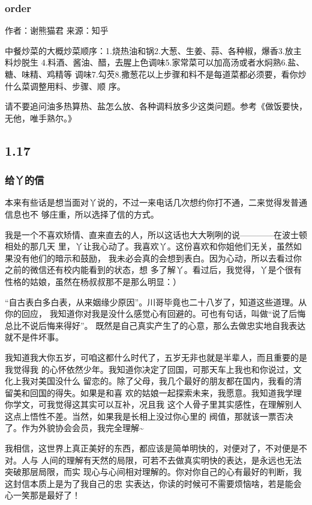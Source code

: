 \documentclass[11pt]{article}
\begin{document}
\subsubsection*{order}
\label{sec:orgheadline29}
作者：谢熊猫君
来源：知乎

中餐炒菜的大概炒菜顺序：1.烧热油和锅2.大葱、生姜、蒜、各种椒，爆香3.放主料炒脱生
4.料酒、酱油、醋，去腥上色调味5.家常菜可以加高汤或者水焖熟6.盐、糖、味精、鸡精等
调味7.勾芡8.撒葱花以上步骤和料不是每道菜都必须要，看你炒什么菜调整用料、步骤、顺
序。

请不要追问油多热算热、盐怎么放、各种调料放多少这类问题。参考《做饭要快，无他，唯手熟尔。》
\subsection*{1.17}
\label{sec:orgheadline32}
\subsubsection*{给丫的信}
\label{sec:orgheadline31}
本来有些话是想当面对丫说的，不过一来电话几次想约你打不通，二来觉得发普通信息也不
够庄重，所以选择了信的方式。

我是一个不喜欢矫情、直来直去的人，所以这话也大大咧咧的说————在波士顿相处的那几天
里，丫让我心动了。我喜欢丫。这份喜欢和你姐他们无关，虽然如果没有他们的暗示和鼓励，
我未必会真的会想到表白。因为心动，所以去看过你之前的微信还有校内能看到的状态，想
多了解丫。看过后，我觉得，丫是个很有性格的姑娘，虽然在杨叔叔那不是那么明显：）


“自古表白多白表，从来姻缘少原因”。川哥毕竟也二十八岁了，知道这些道理。从你的回应，
我知道你对我是没什么感觉心有回避的。可也有句话，叫做“说了后悔总比不说后悔来得好”。
既然是自己真实产生了的心意，那么去做忠实地自我表达就不是件坏事。

我知道我大你五岁，可咱这都什么时代了，五岁无非也就是半辈人，而且重要的是我觉得我
的心怀依然少年。我知道你决定了回国，可那天车上我也和你说过，文化上我对美国没什么
留恋的。除了父母，我几个最好的朋友都在国内，我看的清留美和回国的得失。如果是和喜
欢的姑娘一起探索未来，我愿意。我知道我学理你学文，可我觉得这其实可以互补，况且我
这个人骨子里其实感性，在理解别人这点上悟性不差。当然，如果我是长相上没过你心里的
阀值，那就该一票否决了。作为外貌协会会员，我完全理解\textasciitilde{}

我相信，这世界上真正美好的东西，都应该是简单明快的，对便对了，不对便是不对。人与
人间的理解有天然的局限，可若不去做真实明快的表达，是永远也无法突破那层局限，而实
现心与心间相对理解的。你对你自己的心有最好的判断，我这封信本质上是为了我自己的忠
实表达，你读的时候可不需要烦恼啥，若是能会心一笑那是最好了！
\end{document}
